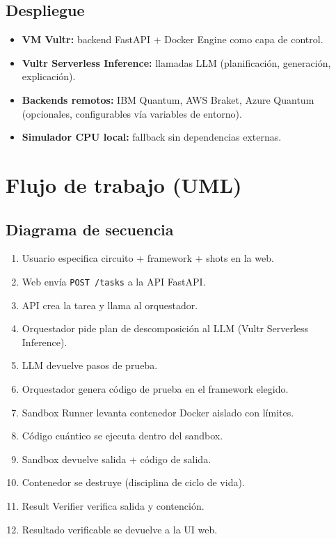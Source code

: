 \documentclass[11pt,a4paper]{article}
\begin{document}
\subsection{Despliegue}

\begin{itemize}
    \item \textbf{VM Vultr:} backend FastAPI + Docker Engine como capa de control.
    \item \textbf{Vultr Serverless Inference:} llamadas LLM (planificación, generación, explicación).
    \item \textbf{Backends remotos:} IBM Quantum, AWS Braket, Azure Quantum (opcionales, configurables vía variables de entorno).
    \item \textbf{Simulador CPU local:} fallback sin dependencias externas.
\end{itemize}

\section{Flujo de trabajo (UML)}

\subsection{Diagrama de secuencia}

\begin{enumerate}
    \item Usuario especifica circuito + framework + shots en la web.
    \item Web envía \texttt{POST /tasks} a la API FastAPI.
    \item API crea la tarea y llama al orquestador.
    \item Orquestador pide plan de descomposición al LLM (Vultr Serverless Inference).
    \item LLM devuelve pasos de prueba.
    \item Orquestador genera código de prueba en el framework elegido.
    \item Sandbox Runner levanta contenedor Docker aislado con límites.
    \item Código cuántico se ejecuta dentro del sandbox.
    \item Sandbox devuelve salida + código de salida.
    \item Contenedor se destruye (disciplina de ciclo de vida).
    \item Result Verifier verifica salida y contención.
    \item Resultado verificable se devuelve a la UI web.
\end{enumerate}
\end{document}

